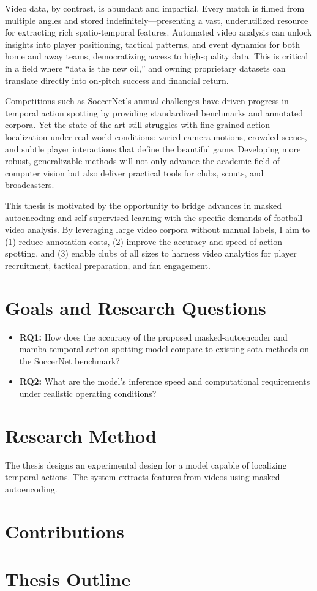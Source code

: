 Video data, by contrast, is abundant and impartial. Every match is filmed from multiple angles and stored indefinitely—presenting a vast, underutilized resource for extracting rich spatio‐temporal features. Automated video analysis can unlock insights into player positioning, tactical patterns, and event dynamics for both home and away teams, democratizing access to high‑quality data. This is critical in a field where “data is the new oil,” and owning proprietary datasets can translate directly into on‑pitch success and financial return.  

Competitions such as SoccerNet’s annual challenges have driven progress in temporal action spotting by providing standardized benchmarks and annotated corpora. Yet the state of the art still struggles with fine‐grained action localization under real‐world conditions: varied camera motions, crowded scenes, and subtle player interactions that define the beautiful game. Developing more robust, generalizable methods will not only advance the academic field of computer vision but also deliver practical tools for clubs, scouts, and broadcasters.  

This thesis is motivated by the opportunity to bridge advances in masked autoencoding and self‐supervised learning with the specific demands of football video analysis. By leveraging large video corpora without manual labels, I aim to (1) reduce annotation costs, (2) improve the accuracy and speed of action spotting, and (3) enable clubs of all sizes to harness video analytics for player recruitment, tactical preparation, and fan engagement.  

\section{Goals and Research Questions}

\begin{itemize}
    \item \textbf{RQ1:} How does the accuracy of the proposed masked-autoencoder and mamba temporal action spotting model compare to existing \acrlong{sota} methods on the SoccerNet benchmark?
    \item \textbf{RQ2:} What are the model’s inference speed and computational requirements under realistic operating conditions?
\end{itemize}

\section{Research Method}

The thesis designs an experimental design for a model capable of localizing temporal actions. The system extracts features from videos using masked autoencoding.

\section{Contributions}

\section{Thesis Outline}

